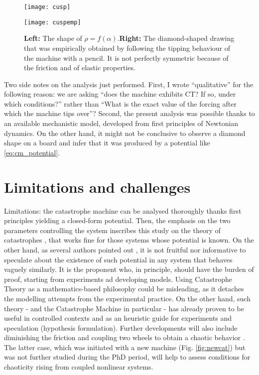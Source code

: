 \begin{figure}[h]
	\centering
	\begin{minipage}[c]{0.48\textwidth}
		\texttt{[image: cusp]}
		\renewcommand{\figurename}{Fig.}
	\end{minipage}
	\hspace{0.05cm}
	\begin{minipage}[c]{0.48\textwidth}
		\texttt{[image: cuspemp]}
		\renewcommand{\figurename}{Fig.}
	\end{minipage} 
	\caption{\small \textbf{Left:} The shape of $\rho = f(\alpha)$.\textbf{Right:} The diamond-shaped drawing that was empirically obtained by following the tipping behaviour of the machine with a pencil. It is not perfectly symmetric because of the friction and of elastic properties. }
	\label{fig:cusptheo}
\end{figure}


Two side notes on the analysis just performed. First, I wrote ``qualitative'' for the following reason: we are asking ``does the machine exhibits CT? If so, under which conditions?'' rather than ``What is the exact value of the forcing after which the machine tips over''? Second, the present analysis was possible thanks to an available mechanistic model, developed from first principles of Newtonian dynamics. On the other hand, it might not be conclusive to observe a diamond shape on a board and infer that it was produced by a potential like \ref{eq:cm_potential}.


\tocless\section{Limitations and challenges}

Limitations: the catastrophe machine can be analysed thoroughly thanks first principles yielding a closed-form potential. Then, the emphasis on the two parameters controlling the system inscribes this study on the theory of catastrophes \citep{Thom2554}, that works fine for those systems whose potential is known. On the other hand, as several authors pointed out \citep{Zahler1977,kolata1977catastrophe}, it is not fruitful nor informative to speculate about the existence of such potential in any system that behaves vaguely similarly. It is the proponent who, in principle, should  have the burden of proof, starting from experiments ad developing models. Using Catastrophe Theory as a mathematics-based philosophy could be misleading, as it detaches the modelling attempts from the experimental practice. On the other hand, such theory - and the Catastrophe Machine in particular - has already proven to be useful in controlled contexts and as an heuristic guide for experiments and speculation (hypothesis formulation). Further developments will also include diminishing the friction and coupling two wheels to obtain a chaotic behavior \citep{nagy2013zeeman}. The latter case, which was initiated with a new machine (Fig. \ref{fig:newcat}) but was not further studied during the PhD period, will help to assess conditions for chaoticity rising from coupled nonlinear systems.

